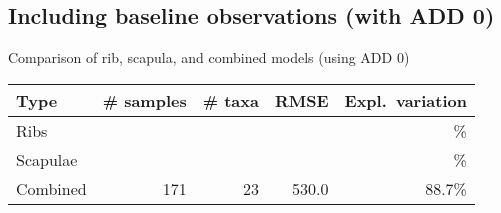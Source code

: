 \documentclass{beamer}
\begin{document}




\subsection{Including baseline observations (with ADD 0)}

\begin{frame}{Comparison of rib, scapula, and combined models (using ADD 0)}

  \begin{tabular}{lrrrr}
    Type & \# samples & \# taxa & RMSE & Expl.\ variation\\ \hline
    Ribs &  &  &  & \% \\
    Scapulae &  &  &  & \% \\
    Combined & 171 & 23 & 530.0 & 88.7\%
  \end{tabular}
  
  \vspace{0.2in}



\end{frame}
\end{document}

